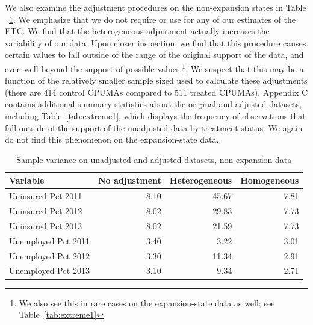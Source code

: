 We also examine the adjustment procedures on the non-expansion states in Table ~\ref{tab:adjust2}. We emphasize that we do not require or use for any of our estimates of the ETC. We find that the heterogeneous adjustment actually increases the variability of our data. Upon closer inspection, we find that this procedure causes certain values to fall outside of the range of the original support of the data, and even well beyond the support of possible values.\footnote{We also see this in rare cases on the expansion-state data as well; see Table~\ref{tab:extreme1}}. We suspect that this may be a function of the relatively smaller sample sized used to calculate these adjustments (there are 414 control CPUMAs compared to 511 treated CPUMAs). Appendix C contains additional summary statistics about the original and adjusted datasets, including Table~\ref{tab:extreme1}, which displays the frequency of observations that fall outside of the support of the unadjusted data by treatment status. We again do not find this phenomenon on the expansion-state data.

\begin{table}[ht]
\caption{Sample variance on unadjusted and adjusted datasets, non-expansion data}
\label{tab:adjust2}
\begin{tabular}{lrrr}
  \hline
Variable & No adjustment & Heterogeneous & Homogeneous \\ 
  \hline
Uninsured Pct 2011 & 8.10 & 45.67 & 7.81 \\ 
  Uninsured Pct 2012 & 8.02 & 29.83 & 7.73 \\ 
  Uninsured Pct 2013 & 8.02 & 21.59 & 7.73 \\ 
  Unemployed Pct 2011 & 3.40 & 3.22 & 3.01 \\ 
  Unemployed Pct 2012 & 3.30 & 11.34 & 2.91 \\ 
  Unemployed Pct 2013 & 3.10 & 9.34 & 2.71 \\ 
   \hline
\end{tabular}
\end{table}
